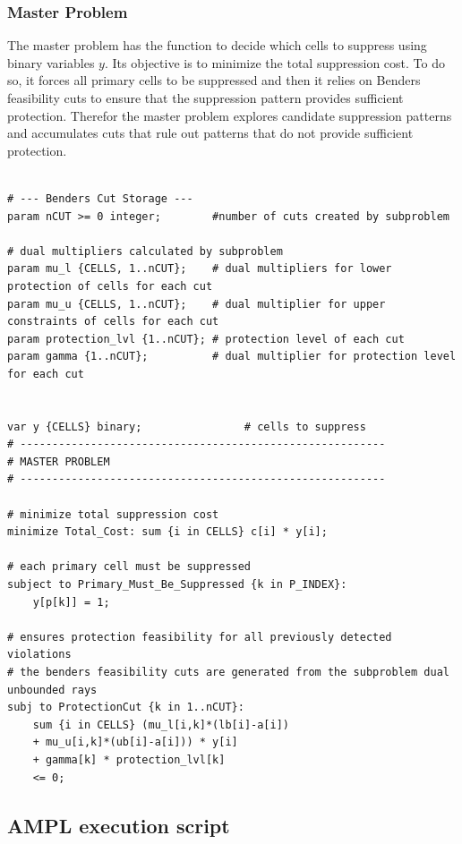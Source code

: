 \documentclass[11pt,a4paper]{article}
\begin{document}
\subsubsection{Master Problem}
The master problem has the function to decide which cells to suppress using binary variables $y$.
Its objective is to minimize the total suppression cost. 
To do so, it forces all primary cells to be suppressed and then it relies on Benders feasibility cuts to ensure that the suppression pattern provides sufficient protection.
Therefor the master problem explores candidate suppression patterns and accumulates cuts that rule out patterns that do not provide sufficient protection.
\begin{lstlisting}

# --- Benders Cut Storage ---
param nCUT >= 0 integer;		#number of cuts created by subproblem

# dual multipliers calculated by subproblem
param mu_l {CELLS, 1..nCUT};	# dual multipliers for lower protection of cells for each cut 
param mu_u {CELLS, 1..nCUT};	# dual multiplier for upper constraints of cells for each cut 
param protection_lvl {1..nCUT};	# protection level of each cut 
param gamma {1..nCUT};			# dual multiplier for protection level for each cut


var y {CELLS} binary;                # cells to suppress
# ---------------------------------------------------------
# MASTER PROBLEM
# ---------------------------------------------------------

# minimize total suppression cost
minimize Total_Cost: sum {i in CELLS} c[i] * y[i];

# each primary cell must be suppressed
subject to Primary_Must_Be_Suppressed {k in P_INDEX}:
    y[p[k]] = 1;
    
# ensures protection feasibility for all previously detected violations
# the benders feasibility cuts are generated from the subproblem dual unbounded rays
subj to ProtectionCut {k in 1..nCUT}:
    sum {i in CELLS} (mu_l[i,k]*(lb[i]-a[i]) 
    + mu_u[i,k]*(ub[i]-a[i])) * y[i]
    + gamma[k] * protection_lvl[k]
    <= 0; 

\end{lstlisting}

\subsection{AMPL execution script}
\end{document}
